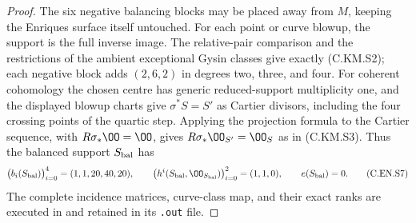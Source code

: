 \begin{proof}
The six negative balancing blocks may be placed away from
$M$, keeping the Enriques surface itself untouched. For
each point or curve blowup, the support is the full inverse
image. The relative-pair comparison and the restrictions
of the ambient exceptional Gysin classes give exactly
(C.KM.S2); each negative block adds $(2,6,2)$ in degrees
two, three, and four. For coherent cohomology the chosen
centre has generic reduced-support multiplicity one, and
the displayed blowup charts give $\sigma^*S=S'$ as
Cartier divisors, including the four crossing points of
the quartic step. Applying the projection formula to the
Cartier sequence, with $R\sigma_*\OO=\OO$, gives
$R\sigma_*\OO_{S'}=\OO_S$ as in (C.KM.S3).
Thus the balanced support $S_{\rm bal}$ has
\[
 \bigl(b_i(S_{\rm bal})\bigr)_{i=0}^4=(1,1,20,40,20),
 \qquad
 \bigl(h^i(S_{\rm bal},\OO_{S_{\rm bal}})\bigr)_{i=0}^2
       =(1,1,0),\qquad e(S_{\rm bal})=0.                 \tag{C.EN.S7}\label{cdp:eq:C.EN.S7}
\]
The complete incidence matrices, curve-class map, and
their exact ranks are executed in
 and retained in its
\texttt{.out} file.

\end{proof}


